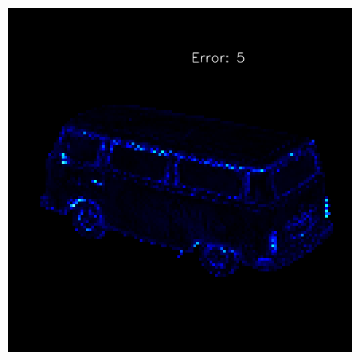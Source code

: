 \begin{figure}
\begin{subfigure}[b]{0.19\linewidth}
	\end{subfigure}
	\begin{subfigure}[b]{0.19\linewidth}
		\includegraphics[width=\linewidth]{./Figures/gcnn_synthetic/fancy_eval_9_error_an2-8-1000.png}
	\end{subfigure}	
	

\end{figure}

